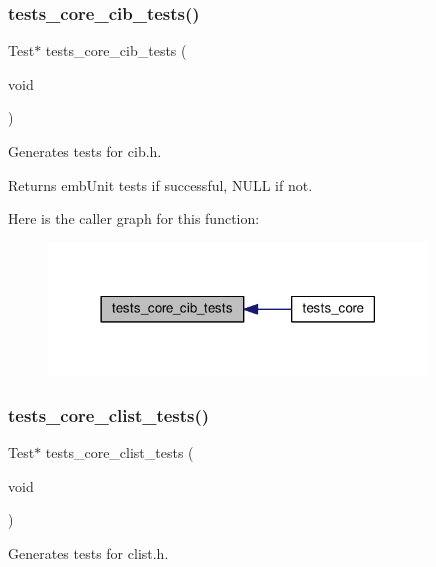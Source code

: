\subsubsection{\texorpdfstring{tests\+\_\+core\+\_\+cib\+\_\+tests()}{tests\_core\_cib\_tests()}}
{\footnotesize\ttfamily Test$\ast$ tests\+\_\+core\+\_\+cib\+\_\+tests (\begin{DoxyParamCaption}\item[{void}]{ }\end{DoxyParamCaption})}



Generates tests for cib.\+h. 

\begin{DoxyReturn}{Returns}
emb\+Unit tests if successful, N\+U\+LL if not. 
\end{DoxyReturn}
Here is the caller graph for this function\+:
\nopagebreak
\begin{figure}[H]
\begin{center}
\leavevmode
\includegraphics[width=285pt]{group__unittests_gaf6c587a2b7c4b7284754cb254d828ae4_icgraph}
\end{center}
\end{figure}
\mbox{\label{group__unittests_gac88d9e2710f9a1471a063c472ba78310}} 
\subsubsection{\texorpdfstring{tests\+\_\+core\+\_\+clist\+\_\+tests()}{tests\_core\_clist\_tests()}}
{\footnotesize\ttfamily Test$\ast$ tests\+\_\+core\+\_\+clist\+\_\+tests (\begin{DoxyParamCaption}\item[{void}]{ }\end{DoxyParamCaption})}



Generates tests for clist.\+h. 


